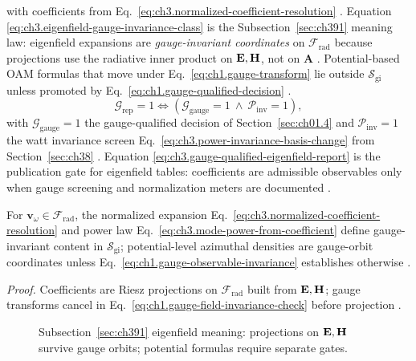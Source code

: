 with coefficients from Eq.~\eqref{eq:ch3.normalized-coefficient-resolution} \cite{stratton1941}. Equation
\eqref{eq:ch3.eigenfield-gauge-invariance-class} is the Subsection~\ref{sec:ch391} meaning law: eigenfield expansions are
\emph{gauge-invariant coordinates} on \(\mathcal{F}_{\mathrm{rad}}\) because projections use the radiative inner product on
\(\mathbf{E},\mathbf{H}\), not on \(\mathbf{A}\) \cite{belinfante1940}. Potential-based OAM formulas that move under
Eq.~\eqref{eq:ch1.gauge-transform} lie outside \(\mathcal{S}_{\mathrm{gi}}\) unless promoted by
Eq.~\eqref{eq:ch1.gauge-qualified-decision} \cite{belinfante1940}.
\begin{equation}
\label{eq:ch3.gauge-qualified-eigenfield-report}
\mathcal{G}_{\mathrm{rep}}=1
\iff
\left(
\mathcal{G}_{\mathrm{gauge}}=1\
\wedge\
\mathcal{P}_{\mathrm{inv}}=1
\right),
\end{equation}
with \(\mathcal{G}_{\mathrm{gauge}}=1\) the gauge-qualified decision of Section~\ref{sec:ch01.4} and \(\mathcal{P}_{\mathrm{inv}}=1\) the watt invariance screen Eq.~\eqref{eq:ch3.power-invariance-basis-change} from Section~\ref{sec:ch38}
\cite{poynting1884}. Equation
\eqref{eq:ch3.gauge-qualified-eigenfield-report} is the publication gate for eigenfield tables: coefficients are admissible
observables only when gauge screening and normalization meters are documented \cite{harrington2001}.
\begin{theorem}[Gauge-invariant eigenfield meaning (HOME)]
\label{thm:ch3.gauge-invariant-eigenfield-meaning}
For \(\mathbf{v}_\omega\in\mathcal{F}_{\mathrm{rad}}\), the normalized expansion
Eq.~\eqref{eq:ch3.normalized-coefficient-resolution} and power law Eq.~\eqref{eq:ch3.mode-power-from-coefficient} define
gauge-invariant content in \(\mathcal{S}_{\mathrm{gi}}\); potential-level azimuthal densities are gauge-orbit coordinates unless
Eq.~\eqref{eq:ch1.gauge-observable-invariance} establishes otherwise \cite{belinfante1940}.
\end{theorem}
\noindent\textit{Proof.}
Coefficients are Riesz projections on \(\mathcal{F}_{\mathrm{rad}}\) built from \(\mathbf{E},\mathbf{H}\); gauge transforms cancel in
Eq.~\eqref{eq:ch1.gauge-field-invariance-check} before projection \cite{stratton1941}.
\begin{figure}[t]
\centering
{}
\caption{Subsection~\ref{sec:ch391} eigenfield meaning: projections on \(\mathbf{E},\mathbf{H}\) survive gauge orbits; potential formulas require separate gates.}
\label{fig:ch3.391-gauge-orbit}
\end{figure}
